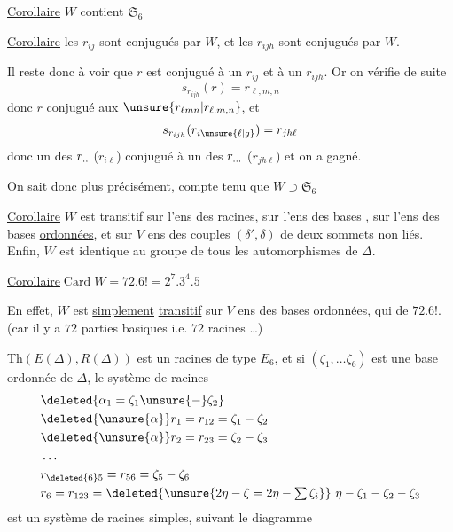 \uline{Corollaire} $W$ contient $\mathfrak S_6$

\uline{Corollaire} les $r_{ij}$ sont conjugués par $W$, et les $r_{ijh}$ sont conjugués par $W$.

Il reste donc à voir que $r$ est conjugué à un $r_{ij}$ et à un $r_{ijh}$.  Or on vérifie  de suite
\[
s_{r_{ijh}}(r)=r_{\ell,m,n}
\]
donc $r$ conjugué aux $\unsure{r_{\ell mn}|r_{\ell,m,n}}$, et
\[
s_{r_{ijh}}(r_{i\unsure{\ell|g}})=r_{jh\ell}
\]
donc  un des $r_{\ldotp\ldotp}$ ($r_{i\ell}$) conjugué à un des $r_{\ldotp\ldotp\ldotp}$ ($r_{jh\ell}$) et on a gagné.

On sait donc plus précisément, compte tenu que $W\supset\mathfrak S_6$

\uline{Corollaire} $W$ est transitif sur l'ens des  racines, sur l'ens des bases , sur l'ens des bases \uline{ordonnées}, et sur $V$ ens  des couples $(\delta',\delta)$ de deux sommets non liés. Enfin, $W$ est identique au groupe de tous les automorphismes de $\Delta$.


\uline{Corollaire}\quad $\operatorname{Card} W=72\mathbin.6!=2^7\mathbin.3^4\mathbin.5$

En effet, $W$ est \uline{simplement} \uline{transitif} sur $V$ ens des bases ordonnées, qui  de $72\mathbin.6!$. (car il y a $72$ parties basiques i.e. $72$ racines \ldots)

\uline{Th}\quad $(E(\Delta),R(\Delta))$ est un   racines de type $E_6$,  et si $(\zeta_1,\ldots\zeta_6)$ est une base ordonnée de $\Delta$, le système de racines
\[
\begin{aligned}
&\deleted{\alpha_1=\zeta_1\unsure{-}\zeta_2}\\
&\deleted{\unsure{\alpha}}r_1=r_{12}=\zeta_1-\zeta_2\\
&\deleted{\unsure{\alpha}}r_2=r_{23}=\zeta_2-\zeta_3\\
&\ldots\\
&r_{\deleted{6}5}=r_{56}=\zeta_5-\zeta_6\\
&r_6=r_{123}=\deleted{\unsure{2\eta-\zeta=2\eta-\textstyle\sum\zeta_i}}\ \eta-\zeta_1-\zeta_2-\zeta_3
\end{aligned}
\]
est un système de racines simples, suivant le diagramme

